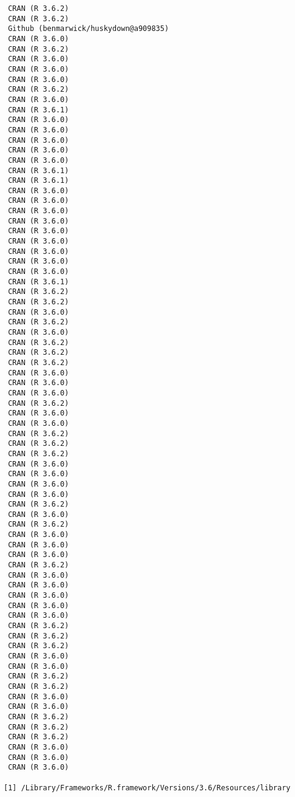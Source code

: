 \documentclass [11pt, proquest] {uwthesis}[2015/03/03]
\begin{document}
\begin{verbatim}
 CRAN (R 3.6.2)                       
 CRAN (R 3.6.2)                       
 Github (benmarwick/huskydown@a909835)
 CRAN (R 3.6.0)                       
 CRAN (R 3.6.2)                       
 CRAN (R 3.6.0)                       
 CRAN (R 3.6.0)                       
 CRAN (R 3.6.0)                       
 CRAN (R 3.6.2)                       
 CRAN (R 3.6.0)                       
 CRAN (R 3.6.1)                       
 CRAN (R 3.6.0)                       
 CRAN (R 3.6.0)                       
 CRAN (R 3.6.0)                       
 CRAN (R 3.6.0)                       
 CRAN (R 3.6.0)                       
 CRAN (R 3.6.1)                       
 CRAN (R 3.6.1)                       
 CRAN (R 3.6.0)                       
 CRAN (R 3.6.0)                       
 CRAN (R 3.6.0)                       
 CRAN (R 3.6.0)                       
 CRAN (R 3.6.0)                       
 CRAN (R 3.6.0)                       
 CRAN (R 3.6.0)                       
 CRAN (R 3.6.0)                       
 CRAN (R 3.6.0)                       
 CRAN (R 3.6.1)                       
 CRAN (R 3.6.2)                       
 CRAN (R 3.6.2)                       
 CRAN (R 3.6.0)                       
 CRAN (R 3.6.2)                       
 CRAN (R 3.6.0)                       
 CRAN (R 3.6.2)                       
 CRAN (R 3.6.2)                       
 CRAN (R 3.6.2)                       
 CRAN (R 3.6.0)                       
 CRAN (R 3.6.0)                       
 CRAN (R 3.6.0)                       
 CRAN (R 3.6.2)                       
 CRAN (R 3.6.0)                       
 CRAN (R 3.6.0)                       
 CRAN (R 3.6.2)                       
 CRAN (R 3.6.2)                       
 CRAN (R 3.6.2)                       
 CRAN (R 3.6.0)                       
 CRAN (R 3.6.0)                       
 CRAN (R 3.6.0)                       
 CRAN (R 3.6.0)                       
 CRAN (R 3.6.2)                       
 CRAN (R 3.6.0)                       
 CRAN (R 3.6.2)                       
 CRAN (R 3.6.0)                       
 CRAN (R 3.6.0)                       
 CRAN (R 3.6.0)                       
 CRAN (R 3.6.2)                       
 CRAN (R 3.6.0)                       
 CRAN (R 3.6.0)                       
 CRAN (R 3.6.0)                       
 CRAN (R 3.6.0)                       
 CRAN (R 3.6.0)                       
 CRAN (R 3.6.2)                       
 CRAN (R 3.6.2)                       
 CRAN (R 3.6.2)                       
 CRAN (R 3.6.0)                       
 CRAN (R 3.6.0)                       
 CRAN (R 3.6.2)                       
 CRAN (R 3.6.2)                       
 CRAN (R 3.6.0)                       
 CRAN (R 3.6.0)                       
 CRAN (R 3.6.2)                       
 CRAN (R 3.6.2)                       
 CRAN (R 3.6.2)                       
 CRAN (R 3.6.0)                       
 CRAN (R 3.6.0)                       
 CRAN (R 3.6.0)                       

[1] /Library/Frameworks/R.framework/Versions/3.6/Resources/library
\end{verbatim}
\backmatter
\end{document}
